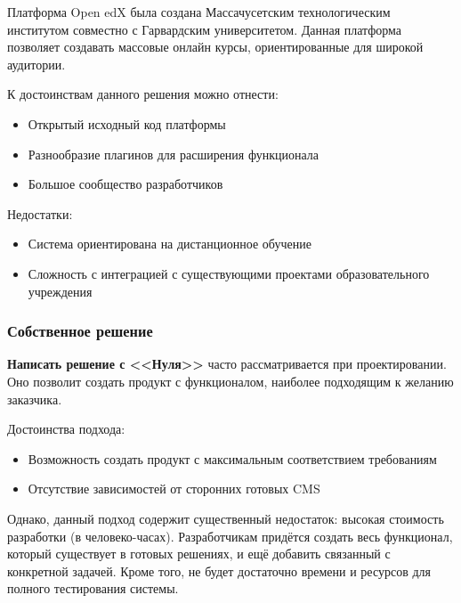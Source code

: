 \documentclass[a4paper,14pt]{article}
\begin{document}
Платформа Open edX была создана Массачусетским технологическим институтом совместно с Гарвардским университетом.
Данная платформа позволяет создавать массовые онлайн курсы, ориентированные для широкой аудитории.

К достоинствам данного решения можно отнести:

\begin{itemize}
	\item Открытый исходный код платформы
	\item Разнообразие плагинов для расширения функционала
	\item Большое сообщество разработчиков
\end{itemize}

Недостатки:

\begin{itemize}
	\item Система ориентирована на дистанционное обучение
	\item Сложность с интеграцией с существующими проектами образовательного учреждения
\end{itemize}

\subsubsection{Собственное решение} 

\textbf{Написать решение с <<Нуля>>} часто рассматривается при проектировании.
Оно позволит создать продукт с функционалом, наиболее подходящим к желанию заказчика.

Достоинства подхода:

\begin{itemize}
	\item Возможность создать продукт с максимальным соответствием требованиям
	\item Отсутствие зависимостей от сторонних готовых CMS 
\end{itemize}

Однако, данный подход содержит существенный недостаток: высокая стоимость разработки (в человеко-часах).
Разработчикам придётся создать весь функционал, который существует в готовых решениях,  и ещё добавить связанный с конкретной задачей.
Кроме того, не будет достаточно времени и ресурсов для полного тестирования системы.



\end{document}
